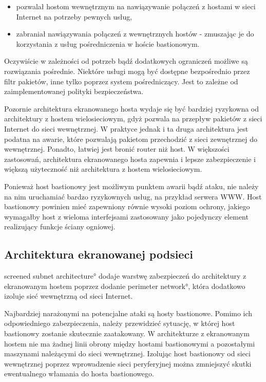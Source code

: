 \begin{itemize}

\item pozwalał hostom wewnętrznym na nawiązywanie połączeń z hostami w sieci
Internet na potrzeby pewnych usług,

\item zabraniał nawiązywania połączeń z wewnętrznych hostów - zmuszając je
do korzystania z usług pośredniczenia w hoście bastionowym.

\end{itemize}

Oczywiście w zależności od potrzeb bądź dodatkowych ograniczeń możliwe są
rozwiązania pośrednie. Niektóre usługi mogą być dostępne bezpośrednio przez
filtr pakietów, inne tylko poprzez system pośredniczący. Jest to zależne od
zaimplementowanej polityki bezpieczeństwa.

Pozornie architektura ekranowanego hosta wydaje się być bardziej ryzykowna
od architektury z hostem wielosieciowym, gdyż pozwala na przepływ pakietów z
sieci Internet do sieci wewnętrznej. W praktyce jednak i ta druga
architektura jest podatna na awarie, które pozwalają pakietom przechodzić z
sieci zewnętrznej do wewnętrznej. Ponadto, łatwiej jest bronić router niż
host. W większości zastosowań, architektura ekranowanego hosta zapewnia i
lepsze zabezpieczenie i większą użyteczność niż architektura z hostem
wielosieciowym.

Ponieważ host bastionowy jest możliwym punktem awarii bądź ataku, nie należy
na nim uruchamiać bardzo ryzykownych usług, na przykład serwera WWW. Host
bastionowy powinien mieć zapewniony równie wysoki poziom ochrony, jakiego
wymagałby host z wieloma interfejsami zastosowany jako pojedynczy element
realizujący funkcje ściany ogniowej.

\subsection{Architektura ekranowanej podsieci}

 \ang{screened subnet architecture}
dodaje warstwę zabezpieczeń do architektury z ekranowanym hostem poprzez
dodanie  \ang{perimeter network}, która dodatkowo
izoluje sieć wewnętrzną od sieci Internet.

Najbardziej narażonymi na potencjalne ataki są hosty bastionowe. Pomimo
ich odpowiedniego zabezpieczenia, należy przewidzieć sytuację, w której host
bastionowy zostanie skutecznie zaatakowany. W architekturze z ekranowanym
hostem nie ma żadnej linii obrony między hostami bastionowymi a pozostałymi
maszynami należącymi do sieci wewnętrznej. Izolując host bastionowy od sieci
wewnętrznej poprzez wprowadzenie sieci peryferyjnej można zmniejszyć skutki
ewentualnego włamania do hosta bastionowego.

